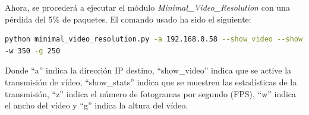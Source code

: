 \newpage

Ahora, se procederá a ejecutar el módulo \textit{Minimal\_Video\_Resolution} con una pérdida del 5\% de paquetes. El comando usado ha sido el siguiente:

\begin{lstlisting}[language=bash,basicstyle=\ttfamily\scriptsize]
python minimal_video_resolution.py -a 192.168.0.58 --show_video --show_stats -z 12 \\
-w 350 -g 250
\end{lstlisting}
Donde ``a'' indica la dirección IP destino, ``show\_video'' indica que se active la transmisión de vídeo, ``show\_stats'' indica que se muestren las estadísticas de la transmisión, ``z'' indica el número de fotogramas por segundo (FPS), ``w'' indica el ancho del vídeo y ``g'' indica la altura del vídeo.
\vspace{\baselineskip}

